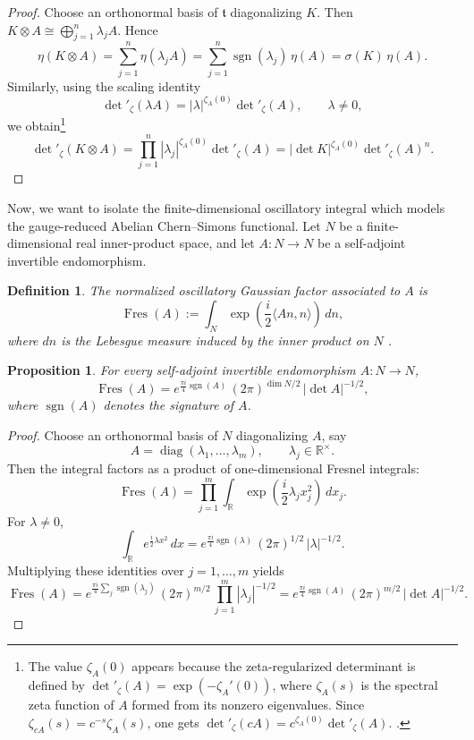 \documentclass[12pt]{amsart}
\numberwithin{equation}{section}
\newtheorem{prop}[theorem]{Proposition}
\newtheorem{definition}[theorem]{Definition}
\begin{document}
\begin{proof}
Choose an orthonormal basis of \(\mathfrak t\) diagonalizing \(K\). Then $K\otimes A\cong \bigoplus_{j=1}^n \lambda_j A.$ Hence
\[
\eta(K\otimes A)=\sum_{j=1}^n \eta(\lambda_j A)
=\sum_{j=1}^n \operatorname{sgn}(\lambda_j)\,\eta(A)
=\sigma(K)\,\eta(A).
\]
Similarly, using the scaling identity
\[
\det\nolimits'_\zeta(\lambda A)=|\lambda|^{\zeta_A(0)}\det\nolimits'_\zeta(A),
\qquad \lambda\neq 0,
\]
we obtain\footnote{The value \(\zeta_A(0)\) appears because the zeta-regularized determinant is defined by
\(\det\nolimits'_{\zeta}(A)=\exp(-\zeta_A'(0))\), where \(\zeta_A(s)\) is the spectral zeta function of \(A\) formed from its nonzero eigenvalues. Since \(\zeta_{cA}(s)=c^{-s}\zeta_A(s)\), one gets
\(\det\nolimits'_{\zeta}(cA)=c^{\zeta_A(0)}\det\nolimits'_{\zeta}(A)\). \cite{Seeley67}.}
\[
\det\nolimits'_\zeta(K\otimes A)
=
\prod_{j=1}^n |\lambda_j|^{\zeta_A(0)}\det\nolimits'_\zeta(A)
=
|\det K|^{\zeta_A(0)}\det\nolimits'_\zeta(A)^n.
\]
\end{proof}
Now, we want to isolate the finite-dimensional oscillatory integral
which models the gauge-reduced Abelian Chern--Simons functional.  Let \(N\) be a finite-dimensional real inner-product space, and let
\(A\colon N\to N\) be a self-adjoint invertible endomorphism.

\begin{definition}
\label{def:fresnel-factor}
The \emph{normalized oscillatory Gaussian factor} associated to \(A\) is
\[
\operatorname{Fres}(A)
:=
\int_N \exp\!\left(\frac{i}{2}\langle An,n\rangle\right)\,dn,
\]
where \(dn\) is the Lebesgue measure induced by the inner product on \(N\) \cite[Section 3.1 and 3.2]{Mnev:2017oko}.
\end{definition}

\begin{prop}
\label{prop:fresnel-factor}
For every self-adjoint invertible endomorphism \(A\colon N\to N\),
\[
\operatorname{Fres}(A)
=
e^{\frac{\pi i}{4}\operatorname{sgn}(A)}\,
(2\pi)^{\dim N/2}\,
|\det A|^{-1/2},
\]
where \(\operatorname{sgn}(A)\) denotes the signature of \(A\).
\end{prop}

\begin{proof}
Choose an orthonormal basis of \(N\) diagonalizing \(A\), say
\[
A=\operatorname{diag}(\lambda_1,\dots,\lambda_m),
\qquad \lambda_j\in \mathbb R^\times.
\]
Then the integral factors as a product of one-dimensional Fresnel integrals:
\[
\operatorname{Fres}(A)
=
\prod_{j=1}^m
\int_{\mathbb R}
\exp\!\left(\frac{i}{2}\lambda_j x_j^2\right)\,dx_j.
\]
For \(\lambda\neq 0\),
\[
\int_{\mathbb R} e^{\frac{i}{2}\lambda x^2}\,dx
=
e^{\frac{\pi i}{4}\operatorname{sgn}(\lambda)}\,
(2\pi)^{1/2}\,
|\lambda|^{-1/2}.
\]
Multiplying these identities over \(j=1,\dots,m\) yields
\[
\operatorname{Fres}(A)
=
e^{\frac{\pi i}{4}\sum_j \operatorname{sgn}(\lambda_j)}\,
(2\pi)^{m/2}\,
\prod_{j=1}^m |\lambda_j|^{-1/2}
=
e^{\frac{\pi i}{4}\operatorname{sgn}(A)}\,
(2\pi)^{m/2}\,
|\det A|^{-1/2}.
\]
\end{proof}
\end{document}
